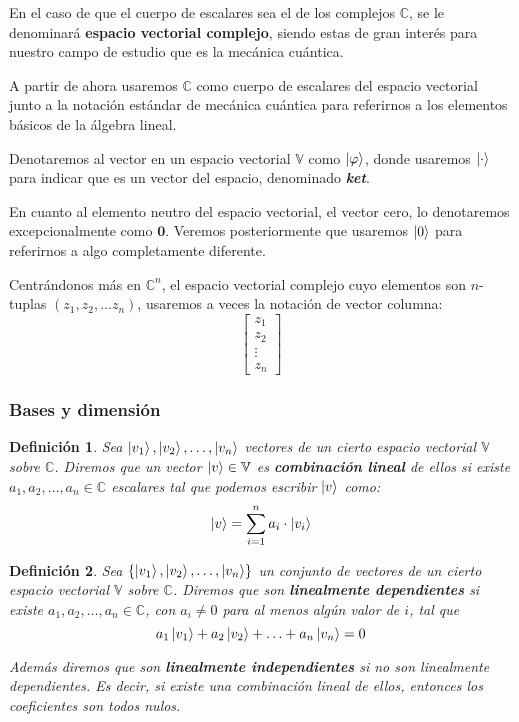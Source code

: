 \documentclass[a4paper]{article}
\newtheorem{deff}{Definición}[section]
\numberwithin{equation}{section}
\begin{document}
En el caso de que el cuerpo de escalares sea el de los complejos $\mathbb{C}$, se le denominará \textbf{espacio vectorial complejo}, siendo estas de gran interés para nuestro campo de estudio que es la mecánica cuántica.

A partir de ahora usaremos $\mathbb{C}$ como cuerpo de escalares del espacio vectorial junto a la notación estándar de mecánica cuántica para referirnos a los elementos básicos de la álgebra lineal.

Denotaremos al vector en un espacio vectorial $\mathbb{V}$ como $\ket{\varphi}$, donde usaremos $\ket{\cdot}$ para indicar que es un vector del espacio, denominado \textbf{\textit{ket}}.

En cuanto al elemento neutro del espacio vectorial, el vector cero, lo denotaremos excepcionalmente como $\mathbf{0}$. Veremos posteriormente que usaremos $\ket{0}$ para referirnos a algo completamente diferente.

Centrándonos más en $\mathbb{C}^n$, el espacio vectorial complejo cuyo elementos son $n$-tuplas $(z_1, z_2, \ldots z_n)$, usaremos a veces la notación de vector columna:
$$\begin{bmatrix}
z_1 \\ z_2 \\ \vdots \\ z_n
\end{bmatrix}$$
\subsubsection{Bases y dimensión}

\begin{deff} Sea $\ket{v_1},\ket{v_2}, \ldots, \ket{v_n}$ vectores de un cierto espacio vectorial $\mathbb{V}$ sobre $\mathbb{C}$. Diremos que un vector $\ket{v}\in\mathbb{V}$ es \textbf{combinación lineal} de ellos si existe $a_1, a_2, \ldots, a_n \in \mathbb{C}$ escalares tal que podemos escribir $\ket{v}$ como:
\begin{equation}
\ket{v} = \sum_{i=1}^n a_i \cdot \ket{v_i}
\end{equation}
\end{deff}

\begin{deff} Sea $\{ \ket{v_1},\ket{v_2}, \ldots, \ket{v_n} \}$ un conjunto de vectores de un cierto espacio vectorial $\mathbb{V}$ sobre $\mathbb{C}$. Diremos que son \textbf{linealmente dependientes} si existe $a_1, a_2, \ldots, a_n \in \mathbb{C}$, con $a_i \neq 0$ para al menos algún valor de $i$, tal que
\begin{equation}
a_1\ket{v_1} + a_2\ket{v_2} + \ldots + a_n\ket{v_n} = 0
\end{equation}

Además diremos que son \textbf{linealmente independientes} si no son linealmente dependientes. Es decir, si existe una combinación lineal de ellos, entonces los coeficientes son todos nulos.
\end{deff}
\end{document}
